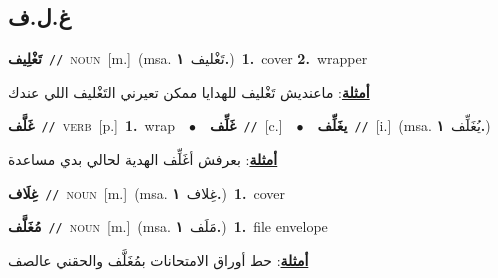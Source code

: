 \documentclass[10pt,a4paper,twoside]{article} %
\begin{document}
\begin{multicols}{2}
\vspace{-3mm}
\subsection*{\color{blue}\foreignlanguage{arabic}{غ.ل.ف}\color{blue}{}} 

{\setlength\topsep{0pt}\textbf{\foreignlanguage{arabic}{تَغْلِيف}}\ {\color{gray}\texttt{//}\color{black}}\ \textsc{noun}\ [m.]\ \color{gray}(msa. \foreignlanguage{arabic}{تَغْليف}~\foreignlanguage{arabic}{\textbf{١.}})\color{black}\ \textbf{1.}~cover  \textbf{2.}~wrapper\  \begin{flushright}\color{gray}\foreignlanguage{arabic}{\textbf{\underline{\foreignlanguage{arabic}{أمثلة}}}: ماعنديش تَغْليف للهدايا ممكن تعيرني التَغْليف اللي عندك}\end{flushright}\color{black}} \vspace{2mm}

{\setlength\topsep{0pt}\textbf{\foreignlanguage{arabic}{غَلَّف}}\ {\color{gray}\texttt{//}\color{black}}\ \textsc{verb}\ [p.]\ \textbf{1.}~wrap\ \ $\bullet$\ \ \setlength\topsep{0pt}\textbf{\foreignlanguage{arabic}{غَلِّف}}\ {\color{gray}\texttt{//}\color{black}}\ [c.]\ \ $\bullet$\ \ \setlength\topsep{0pt}\textbf{\foreignlanguage{arabic}{يغَلِّف}}\ {\color{gray}\texttt{//}\color{black}}\ [i.]\ \color{gray}(msa. \foreignlanguage{arabic}{يُغَلِّف}~\foreignlanguage{arabic}{\textbf{١.}})\color{black}\  \begin{flushright}\color{gray}\foreignlanguage{arabic}{\textbf{\underline{\foreignlanguage{arabic}{أمثلة}}}: بعرفش أغَلِّف الهدية لحالي بدي مساعدة}\end{flushright}\color{black}} \vspace{2mm}

{\setlength\topsep{0pt}\textbf{\foreignlanguage{arabic}{غِلَاف}}\ {\color{gray}\texttt{//}\color{black}}\ \textsc{noun}\ [m.]\ \color{gray}(msa. \foreignlanguage{arabic}{غِلاف}~\foreignlanguage{arabic}{\textbf{١.}})\color{black}\ \textbf{1.}~cover\ } \vspace{2mm}

{\setlength\topsep{0pt}\textbf{\foreignlanguage{arabic}{مُغَلَّف}}\ {\color{gray}\texttt{//}\color{black}}\ \textsc{noun}\ [m.]\ \color{gray}(msa. \foreignlanguage{arabic}{مَلَف}~\foreignlanguage{arabic}{\textbf{١.}})\color{black}\ \textbf{1.}~file envelope\  \begin{flushright}\color{gray}\foreignlanguage{arabic}{\textbf{\underline{\foreignlanguage{arabic}{أمثلة}}}: حط أوراق الامتحانات بمُغَلَّف والحقني عالصف}\end{flushright}\color{black}} \vspace{2mm}


\end{multicols}
\end{document}

